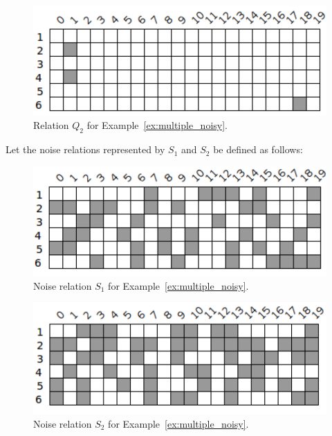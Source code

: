 \begin{example}
	\begin{figure}[ht]
		\centering
		\includegraphics[scale=0.65]{Figures/PDF/Relview/Q2.pdf}
		\caption{Relation $Q_2$ for Example~\ref{ex:multiple_noisy}.}
		\label{fig:multiple_noisy_q2}
	\end{figure}

	Let the noise relations represented by $S_1$ and $S_2$ be defined as follows: \newpage

	\begin{figure}[ht]
		\centering
		\includegraphics[scale=0.65]{Figures/PDF/Relview/NoiseQ1.pdf}
		\caption{Noise relation $S_1$ for Example~\ref{ex:multiple_noisy}.}
		\label{fig:multiple_noisy_s1}
	\end{figure}
	
	\begin{figure}[ht]
		\centering
		\includegraphics[scale=0.65]{Figures/PDF/Relview/NoiseQ2.pdf}
		\caption{Noise relation $S_2$ for Example~\ref{ex:multiple_noisy}.}
		\label{fig:multiple_noisy_s2}
	\end{figure}
	

\end{example}
